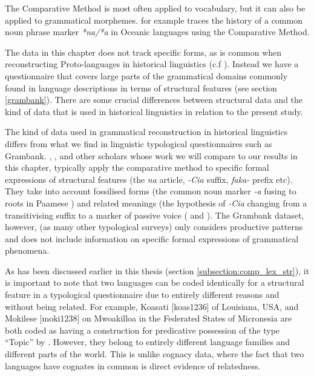 \documentclass[draft,10pt]{article} %
\begin{document}



The Comparative Method is most often applied to vocabulary, but it can also be applied to grammatical morphemes. \citet{crowley1985common} for example traces the history of a common noun phrase marker \emph{*na/*a} in Oceanic languages using the Comparative Method. 

The data in this chapter does not track specific forms, as is common when reconstructing Proto-languages in historical linguistics (c.f \citet{pawley1973some, crowley1985common, evans2003study}). Instead we have a questionnaire that covers large parts of the grammatical domains commonly found in language descriptions in terms of structural features (see section \ref{grambank}). There are some crucial differences between structural data and the kind of data that is used in historical linguistics in relation to the present study.

The kind of data used in grammatical reconstruction in historical linguistics differs from what we find in linguistic typological questionnaires such as Grambank. \citet{crowley1985common}, \citet{clark1976aspects}, and other scholars whose work we will compare to our results in this chapter, typically apply the comparative method to specific formal expressions of structural features (the \emph{na} article, \emph{-Cia} suffix, \emph{faka-} prefix etc). They take into account fossilised forms (the common noun marker \emph{-a} fusing to roots in Paamese \citep[141]{crowley1985common}) and related meanings (the hypothesis of \emph{-Cia} changing from a transitivising suffix to a marker of passive voice (\citet{hale_1968, hohepa_1967, hohepa_1969, chung1978} and \citet{jonsson1998}). The Grambank dataset, however, (as many other typological surveys) only considers productive patterns and does not include information on specific formal expressions of grammatical phenomena.

As has been discussed earlier in this thesis (section \ref{subsection:comp_lex_str}), it is important to note that two languages can be coded identically for a structural feature in a typological questionnaire due to entirely different reasons and without being related. For example, Koasati [koas1236] of Louisiana, USA, and Mokilese [moki1238] on Mwoakilloa in the Federated States of Micronesia are both coded as having a construction for predicative possession of the type ``Topic'' by \citet{wals-2011-117}. However, they belong to entirely different language families and different parts of the world. This is unlike cognacy data, where the fact that two languages have cognates in common is direct evidence of relatedness.
\end{document}

